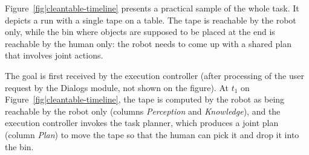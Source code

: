 \documentclass[preprint,3p,times]{elsarticle}
\newcommand{\action}[3]{#1\\\textsf{\scriptsize #2,}\\\textsf{\scriptsize #3}}
\begin{document}
%
%
%
%
%
%
%
%
%
%
%

Figure~\ref{fig|cleantable-timeline} presents a practical sample of the whole
task. It depicts a run with a single tape on a table. The tape is
reachable by the robot only, while the bin where objects are supposed to be
placed at the end is reachable by the human only: the robot needs to come up
with a shared plan that involves joint actions.

The goal is first received by the execution controller (after processing of the
user request by the {\sc Dialogs} module, not shown on the figure). At $t_1$ on
Figure~\ref{fig|cleantable-timeline}, the tape is computed by the robot as being
reachable by the robot only (columns \emph{Perception} and \emph{Knowledge}),
and the execution controller invokes the task planner, which produces a joint
plan (column \emph{Plan}) to move the tape so that the human can pick it and
drop it into the bin.
\end{document}
